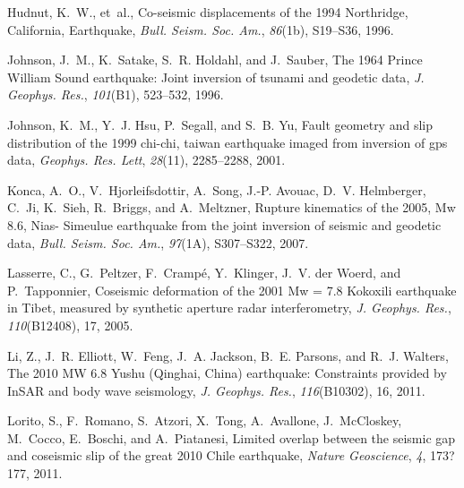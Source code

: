 \documentclass[10pt]{article}
\begin{document}
\begin{thebibliography}{38}
Hudnut, K.~W., et~al., {Co-seismic displacements of the 1994 Northridge,
  California, Earthquake}, \textit{Bull. Seism. Soc. Am.}, \textit{86}(1b),
  S19--S36, 1996.

Johnson, J.~M., K.~Satake, S.~R. Holdahl, and J.~Sauber, {The 1964 Prince
  William Sound earthquake: Joint inversion of tsunami and geodetic data},
  \textit{J. Geophys. Res.}, \textit{101}(B1), 523--532, 1996.

Johnson, K.~M., Y.~J. Hsu, P.~Segall, and S.~B. Yu, Fault geometry and slip
  distribution of the 1999 chi-chi, taiwan earthquake imaged from inversion of
  gps data, \textit{Geophys. Res. Lett}, \textit{28}(11), 2285--2288, 2001.

Konca, A.~O., V.~Hjorleifsdottir, A.~Song, J.-P. Avouac, D.~V. Helmberger,
  C.~Ji, K.~Sieh, R.~Briggs, and A.~Meltzner, {Rupture kinematics of the 2005,
  Mw 8.6, Nias- Simeulue earthquake from the joint inversion of seismic and
  geodetic data}, \textit{Bull. Seism. Soc. Am.}, \textit{97}(1A), S307--S322,
  2007.

Lasserre, C., G.~Peltzer, F.~Cramp\'{e}, Y.~Klinger, J.~V. der Woerd, and
  P.~Tapponnier, {Coseismic deformation of the 2001 Mw = 7.8 Kokoxili
  earthquake in Tibet, measured by synthetic aperture radar interferometry},
  \textit{J. Geophys. Res.}, \textit{110}(B12408), 17, 2005.

Li, Z., J.~R. Elliott, W.~Feng, J.~A. Jackson, B.~E. Parsons, and R.~J.
  Walters, {The 2010 MW 6.8 Yushu (Qinghai, China) earthquake: Constraints
  provided by InSAR and body wave seismology}, \textit{J. Geophys. Res.},
  \textit{116}(B10302), 16, 2011.

Lorito, S., F.~Romano, S.~Atzori, X.~Tong, A.~Avallone, J.~McCloskey, M.~Cocco,
  E.~Boschi, and A.~Piatanesi, {Limited overlap between the seismic gap and
  coseismic slip of the great 2010 Chile earthquake}, \textit{Nature
  Geoscience}, \textit{4}, 173?177, 2011.


\end{thebibliography}
\end{document}
